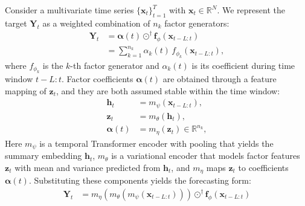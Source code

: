﻿\documentclass[journal]{IEEEtran}
\begin{document}
Consider a multivariate time series $\{\mathbf{x}_t\}_{t=1}^{T}$ with $\mathbf{x}_t\in\mathbb{R}^{N}$. We represent the target $\mathbf{Y}_t$ as a weighted combination of $n_k$ factor generators:
\begin{equation}
\begin{aligned}
\mathbf{Y}_t&=\boldsymbol{\alpha}(t)\odot^{\dagger}\mathbf{f}_{\phi}\!\left(\mathbf{x}_{t-L:t}\right)\\
&=\sum_{k=1}^{n_k}\alpha_{k}(t)\,f_{\phi_k}\!\left(\mathbf{x}_{t-L:t}\right),
\end{aligned}
\end{equation}
where $f_{\phi_k}$ is the $k$-th factor generator and $\alpha_{k}(t)$ is its coefficient during time window $t-L:t$. Factor coefficients $\boldsymbol{\alpha}(t)$ are obtained through a feature mapping of $\mathbf{z}_{t}$, and they are both assumed stable within the time window:
\begin{equation}
\begin{aligned}
\mathbf{h}_{t}&=m_{\psi}\!\left(\mathbf{x}_{t-L:t}\right),\\
\mathbf{z}_{t}&=m_{\theta}\!\left(\mathbf{h}_{t}\right),\\
\boldsymbol{\alpha}(t)&=m_{\eta}\!\left(\mathbf{z}_{t}\right)\in\mathbb{R}^{n_k},
\end{aligned}
\end{equation}
Here $m_{\psi}$ is a temporal Transformer encoder with pooling that yields the summary embedding $\mathbf{h}_t$, $m_{\theta}$ is a variational encoder that models factor features $\mathbf{z}_t$ with mean and variance predicted from $\mathbf{h}_t$, and $m_{\eta}$ maps $\mathbf{z}_t$ to coefficients $\boldsymbol{\alpha}(t)$. Substituting these components yields the forecasting form:
\begin{equation}
\begin{aligned}
\mathbf{Y}_t&=m_{\eta}\left(m_{\theta}\left(m_{\psi}\!\left(\mathbf{x}_{t-L:t}\right)\right)\right)\odot^{\dagger}\mathbf{f}_{\phi}\!\left(\mathbf{x}_{t-L:t}\right)
\end{aligned}
\end{equation}
\end{document}
